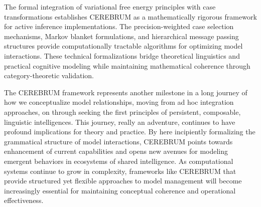 The formal integration of variational free energy principles with case
transformations establishes CEREBRUM as a mathematically rigorous
framework for active inference implementations. The precision-weighted
case selection mechanisms, Markov blanket formulations, and hierarchical
message passing structures provide computationally tractable algorithms
for optimizing model interactions. These technical formalizations bridge
theoretical linguistics and practical cognitive modeling while
maintaining mathematical coherence through category-theoretic
validation.

The CEREBRUM framework represents another milestone in a long journey of
how we conceptualize model relationships, moving from ad hoc integration
approaches, on through seeking the first principles of persistent,
composable, linguistic intelligences. This journey, really an adventure,
continues to have profound implications for theory and practice. By here
incipiently formalizing the grammatical structure of model interactions,
CEREBRUM points towards enhancement of current capabilities and opens
new avenues for modeling emergent behaviors in ecosystems of shared
intelligence. As computational systems continue to grow in complexity,
frameworks like CEREBRUM that provide structured yet flexible approaches
to model management will become increasingly essential for maintaining
conceptual coherence and operational effectiveness.


